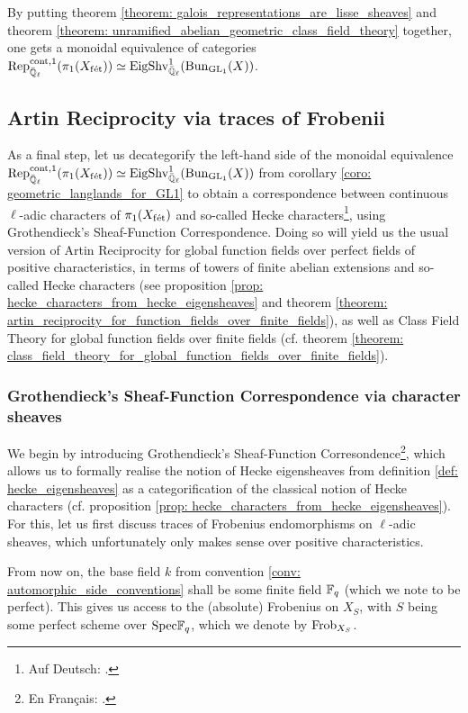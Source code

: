         \begin{corollary} \label{coro: geometric_langlands_for_GL1}
            By putting theorem \ref{theorem: galois_representations_are_lisse_sheaves} and theorem \ref{theorem: unramified_abelian_geometric_class_field_theory} together, one gets a monoidal equivalence of categories $\mathrm{Rep}^{\mathrm{cont}, 1}_{\bar{\mathbb{Q}}_{\ell}}(\pi_1(X_{\mathrm{f\acute{e}t}})) \simeq \mathrm{Eig}\mathrm{Shv}_{\bar{\mathbb{Q}}_{\ell}}^1(\mathrm{Bun}_{\operatorname{GL}_1}(X))$. 
        \end{corollary}
        
    \subsection{Artin Reciprocity via traces of Frobenii}
        As a final step, let us decategorify the left-hand side of the monoidal equivalence $\mathrm{Rep}^{\mathrm{cont}, 1}_{\bar{\mathbb{Q}}_{\ell}}(\pi_1(X_{\mathrm{f\acute{e}t}})) \simeq \mathrm{Eig}\mathrm{Shv}_{\bar{\mathbb{Q}}_{\ell}}^1(\mathrm{Bun}_{\operatorname{GL}_1}(X))$ from corollary \ref{coro: geometric_langlands_for_GL1} to obtain a correspondence between continuous $\ell$-adic characters of $\pi_1(X_{\mathrm{f\acute{e}t}})$ and so-called Hecke characters\footnote{Auf Deutsch: .}, using Grothendieck's Sheaf-Function Correspondence. Doing so will yield us the usual version of Artin Reciprocity for global function fields over perfect fields of positive characteristics, in terms of towers of finite abelian extensions and so-called Hecke characters (see proposition \ref{prop: hecke_characters_from_hecke_eigensheaves} and theorem \ref{theorem: artin_reciprocity_for_function_fields_over_finite_fields}), as well as Class Field Theory for global function fields over finite fields (cf. theorem \ref{theorem: class_field_theory_for_global_function_fields_over_finite_fields}).
        
        \subsubsection{Grothendieck's Sheaf-Function Correspondence via character sheaves}
            We begin by introducing Grothendieck's Sheaf-Function Corresondence\footnote{En Français: .}, which allows us to formally realise the notion of Hecke eigensheaves from definition \ref{def: hecke_eigensheaves} as a categorification of the classical notion of Hecke characters (cf. proposition \ref{prop: hecke_characters_from_hecke_eigensheaves}). For this, let us first discuss traces of Frobenius endomorphisms on $\ell$-adic sheaves, which unfortunately only makes sense over positive characteristics.
            \begin{convention} \label{conv: frobenii}
                From now on, the base field $k$ from convention \ref{conv: automorphic_side_conventions} shall be some finite field $\mathbb{F}_q$ (which we note to be perfect). This gives us access to the (absolute) Frobenius on $X_S$, with $S$ being some perfect scheme over $\mathrm{Spec} \mathbb{F}_q$, which we denote by $\mathrm{Frob}_{X_S}$.
            \end{convention}
            
